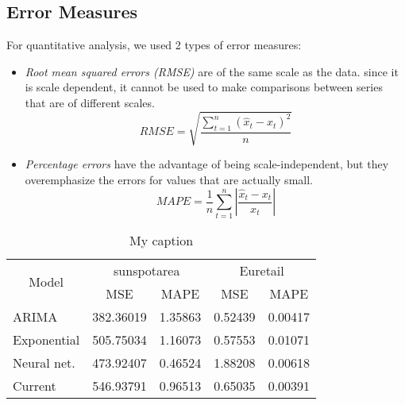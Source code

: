 \subsection{Error Measures}
For quantitative analysis, we used 2 types of error measures:

\begin{itemize}
\item \textit{Root mean squared errors (RMSE)} are of the same scale as the data. since it is scale dependent, it cannot be used to make comparisons between series that are of different scales. \cite{forecasting_otexts}
$$RMSE=\sqrt{\frac{\sum_{t=1}^{n}(\hat{x}_{t}-x_{t})^{2}}{n}}$$
\item \textit{Percentage errors} have the advantage of being scale-independent, but they overemphasize the errors for values that are actually small.
$$MAPE=\frac{1}{n}\sum_{t=1}^{n}\left | \frac{\hat{x}_{t}-x_{t}}{x_{t}} \right |$$
\end{itemize}


\begin{table}[]
\centering
\caption{My caption}
\label{my-label}
\begin{tabular}{|l|l|r|r|r|}
\hline
\multicolumn{1}{|c|}{\multirow{2}{*}{Model}} & \multicolumn{2}{c|}{sunspotarea}                     & \multicolumn{2}{c|}{Euretail}                        \\ \cline{2-5} 
\multicolumn{1}{|c|}{}                       & \multicolumn{1}{c|}{MSE} & \multicolumn{1}{c|}{MAPE} & \multicolumn{1}{c|}{MSE} & \multicolumn{1}{c|}{MAPE} \\ \hline
ARIMA                                        & 382.36019                & 1.35863                   & 0.52439                  & 0.00417                   \\ \hline
Exponential                                  & 505.75034                & 1.16073                   & 0.57553                  & 0.01071                   \\ \hline
Neural net.                                         & 473.92407                & 0.46524                   & 1.88208                  & 0.00618                   \\ \hline
Current                                      & 546.93791                & 0.96513                   & 0.65035                  & 0.00391                   \\ \hline
\end{tabular}
\end{table}

